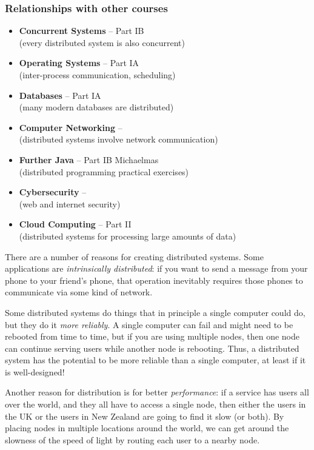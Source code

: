 \begin{frame}
    \label{s:other-courses}
    \frametitle{Relationships with other courses}
    \begin{itemize}
        \item \textbf{Concurrent Systems} -- Part IB\\
            (every distributed system is also concurrent)
        \item \textbf{Operating Systems} -- Part IA\\
            (inter-process communication, scheduling)
        \item \textbf{Databases} -- Part IA\\
            (many modern databases are distributed)
        \item \textbf{Computer Networking} -- \whenisnetworking\\
            (distributed systems involve network communication)
        \item \textbf{Further Java} -- Part IB Michaelmas\\
            (distributed programming practical exercises)
        \item \textbf{Cybersecurity} -- \whenissecurity\\
            (web and internet security)
        \item \textbf{Cloud Computing} -- Part II\\
            (distributed systems for processing large amounts of data)
    \end{itemize}
\end{frame}
\label{l:other-courses}

There are a number of reasons for creating distributed systems.
Some applications are \emph{intrinsically distributed}: if you want to send a message from your phone to your friend's phone, that operation inevitably requires those phones to communicate via some kind of network.

Some distributed systems do things that in principle a single computer could do, but they do it \emph{more reliably}.
A single computer can fail and might need to be rebooted from time to time, but if you are using multiple nodes, then one node can continue serving users while another node is rebooting.
Thus, a distributed system has the potential to be more reliable than a single computer, at least if it is well-designed!

Another reason for distribution is for better \emph{performance}: if a service has users all over the world, and they all have to access a single node, then either the users in the UK or the users in New Zealand are going to find it slow (or both).
By placing nodes in multiple locations around the world, we can get around the slowness of the speed of light by routing each user to a nearby node.

